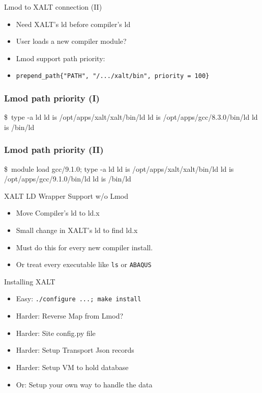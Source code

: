 \documentclass{beamer}
\begin{document}
\begin{frame}{Lmod to XALT connection (II)}
  \begin{itemize}
    \item Need XALT's ld before compiler's ld
    \item User loads a new compiler module?
    \item Lmod support path priority:
    \item \texttt{prepend\_path\{"PATH", "/.../xalt/bin", priority = 100\}}
  \end{itemize}
\end{frame}

\begin{frame}[fragile]
    \frametitle{Lmod path priority (I)}
 {\small
    \begin{semiverbatim}
\$ type -a ld                     
ld is /opt/apps/xalt/xalt/bin/ld
ld is /opt/apps/gcc/8.3.0/bin/ld
ld is /bin/ld
    \end{semiverbatim}
}
\end{frame}

\begin{frame}[fragile]
    \frametitle{Lmod path priority (II)}
 {\small
    \begin{semiverbatim}
\$ module load gcc/9.1.0; type -a ld                     
ld is /opt/apps/xalt/xalt/bin/ld
ld is /opt/apps/gcc/9.1.0/bin/ld
ld is /bin/ld
    \end{semiverbatim}
}
\end{frame}

\begin{frame}{XALT LD Wrapper Support w/o Lmod}
  \begin{itemize}
    \item Move Compiler's ld to ld.x
    \item Small change in XALT's ld to find ld.x
    \item Must do this for every new compiler install.
    \item Or treat every executable like \texttt{ls} or \texttt{ABAQUS}
  \end{itemize}
\end{frame}

\begin{frame}{Installing XALT}
  \begin{itemize}
    \item Easy: \texttt{./configure ...; make install}
    \item Harder: Reverse Map from Lmod?
    \item Harder: Site config.py file
    \item Harder: Setup Transport Json records
    \item Harder: Setup VM to hold database
    \item Or: Setup your own way to handle the data
  \end{itemize}
\end{frame}
\end{document}
